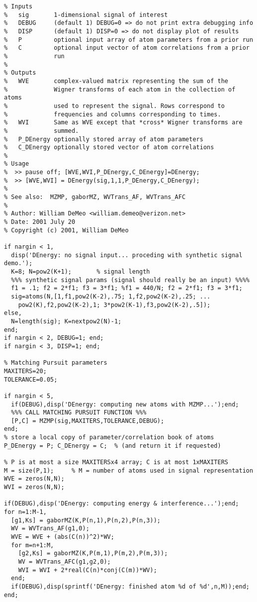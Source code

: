 \begin{small}\begin{verbatim}
% Inputs
%   sig       1-dimensional signal of interest
%   DEBUG     (default 1) DEBUG=0 => do not print extra debugging info
%   DISP      (default 1) DISP=0 => do not display plot of results
%   P         optional input array of atom parameters from a prior run
%   C         optional input vector of atom correlations from a prior
%             run  
%
% Outputs
%   WVE       complex-valued matrix representing the sum of the
%             Wigner transforms of each atom in the collection of atoms
%             used to represent the signal. Rows correspond to
%             frequencies and columns corresponding to times.
%   WVI       Same as WVE except that *cross* Wigner transforms are
%             summed.
%   P_DEnergy optionally stored array of atom parameters
%   C_DEnergy optionally stored vector of atom correlations
%
% Usage
%  >> pause off; [WVE,WVI,P_DEnergy,C_DEnergy]=DEnergy;
%  >> [WVE,WVI] = DEnergy(sig,1,1,P_DEnergy,C_DEnergy);
%
% See also:  MZMP, gaborMZ, WVTrans_AF, WVTrans_AFC
%
% Author: William DeMeo <william.demeo@verizon.net>
% Date: 2001 July 20
% Copyright (c) 2001, William DeMeo

if nargin < 1, 
  disp('DEnergy: no signal input... proceding with synthetic signal demo.');
  K=8; N=pow2(K+1);       % signal length
  %%% synthetic signal params (signal should really be an input) %%%%
  f1 = .1; f2 = 2*f1; f3 = 3*f1; %f1 = 440/N; f2 = 2*f1; f3 = 3*f1;
  sig=atoms(N,[1,f1,pow2(K-2),.75; 1,f2,pow2(K-2),.25; ...
    pow2(K),f2,pow2(K-2),1; 3*pow2(K-1),f3,pow2(K-2),.5]);
else,  
  N=length(sig); K=nextpow2(N)-1; 
end;
if nargin < 2, DEBUG=1; end;
if nargin < 3, DISP=1; end;

% Matching Pursuit parameters
MAXITERS=20; 
TOLERANCE=0.05;

if nargin < 5,
  if(DEBUG),disp('DEnergy: computing new atoms with MZMP...');end;
  %%% CALL MATCHING PURSUIT FUNCTION %%%
  [P,C] = MZMP(sig,MAXITERS,TOLERANCE,DEBUG);
end;
% store a local copy of parameter/correlation book of atoms 
P_DEnergy = P; C_DEnergy = C;  % (and return it if requested)

% P is at most a size MAXITERSx4 array; C is at most 1xMAXITERS
M = size(P,1);     % M = number of atoms used in signal representation
WVE = zeros(N,N);
WVI = zeros(N,N);

if(DEBUG),disp('DEnergy: computing energy & interference...');end;
for n=1:M-1,
  [g1,Ks] = gaborMZ(K,P(n,1),P(n,2),P(n,3));
  WV = WVTrans_AF(g1,0);
  WVE = WVE + (abs(C(n))^2)*WV;
  for m=n+1:M,
    [g2,Ks] = gaborMZ(K,P(m,1),P(m,2),P(m,3));
    WV = WVTrans_AFC(g1,g2,0);
    WVI = WVI + 2*real(C(n)*conj(C(m))*WV);
  end;
  if(DEBUG),disp(sprintf('DEnergy: finished atom %d of %d',n,M));end;
end;


\end{verbatim}
\end{small}
